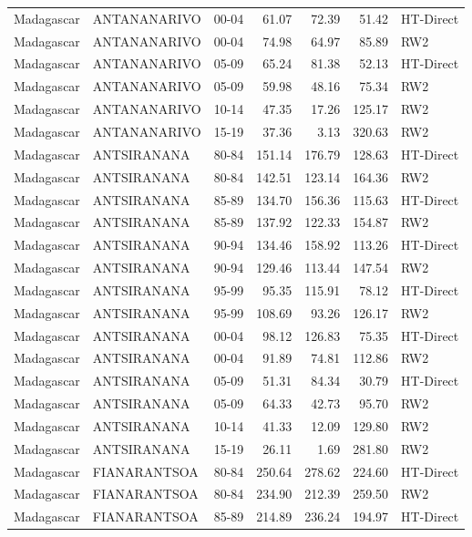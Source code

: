 \begin{longtable}{lllrrrl}
  Madagascar & ANTANANARIVO & 00-04 & 61.07 & 72.39 & 51.42 & HT-Direct \\ 
  Madagascar & ANTANANARIVO & 00-04 & 74.98 & 64.97 & 85.89 & RW2 \\ 
  Madagascar & ANTANANARIVO & 05-09 & 65.24 & 81.38 & 52.13 & HT-Direct \\ 
  Madagascar & ANTANANARIVO & 05-09 & 59.98 & 48.16 & 75.34 & RW2 \\ 
  Madagascar & ANTANANARIVO & 10-14 & 47.35 & 17.26 & 125.17 & RW2 \\ 
  Madagascar & ANTANANARIVO & 15-19 & 37.36 & 3.13 & 320.63 & RW2 \\ 
  Madagascar & ANTSIRANANA & 80-84 & 151.14 & 176.79 & 128.63 & HT-Direct \\ 
  Madagascar & ANTSIRANANA & 80-84 & 142.51 & 123.14 & 164.36 & RW2 \\ 
  Madagascar & ANTSIRANANA & 85-89 & 134.70 & 156.36 & 115.63 & HT-Direct \\ 
  Madagascar & ANTSIRANANA & 85-89 & 137.92 & 122.33 & 154.87 & RW2 \\ 
  Madagascar & ANTSIRANANA & 90-94 & 134.46 & 158.92 & 113.26 & HT-Direct \\ 
  Madagascar & ANTSIRANANA & 90-94 & 129.46 & 113.44 & 147.54 & RW2 \\ 
  Madagascar & ANTSIRANANA & 95-99 & 95.35 & 115.91 & 78.12 & HT-Direct \\ 
  Madagascar & ANTSIRANANA & 95-99 & 108.69 & 93.26 & 126.17 & RW2 \\ 
  Madagascar & ANTSIRANANA & 00-04 & 98.12 & 126.83 & 75.35 & HT-Direct \\ 
  Madagascar & ANTSIRANANA & 00-04 & 91.89 & 74.81 & 112.86 & RW2 \\ 
  Madagascar & ANTSIRANANA & 05-09 & 51.31 & 84.34 & 30.79 & HT-Direct \\ 
  Madagascar & ANTSIRANANA & 05-09 & 64.33 & 42.73 & 95.70 & RW2 \\ 
  Madagascar & ANTSIRANANA & 10-14 & 41.33 & 12.09 & 129.80 & RW2 \\ 
  Madagascar & ANTSIRANANA & 15-19 & 26.11 & 1.69 & 281.80 & RW2 \\ 
  Madagascar & FIANARANTSOA & 80-84 & 250.64 & 278.62 & 224.60 & HT-Direct \\ 
  Madagascar & FIANARANTSOA & 80-84 & 234.90 & 212.39 & 259.50 & RW2 \\ 
  Madagascar & FIANARANTSOA & 85-89 & 214.89 & 236.24 & 194.97 & HT-Direct \\ 

\end{longtable}
